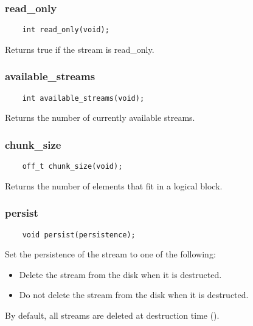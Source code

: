 \subsubsection{read\_only}
\begin{verbatim}
    int read_only(void);
\end{verbatim}
Returns true if the stream is read\_only.

    
\subsubsection{available\_streams}
\begin{verbatim}
    int available_streams(void);    
\end{verbatim}
Returns the number of currently available streams.

\subsubsection{chunk\_size}
\begin{verbatim}
    off_t chunk_size(void);
\end{verbatim}
Returns the number of elements that fit in a logical block.

\subsubsection{persist}
\begin{verbatim}
    void persist(persistence);
\end{verbatim}
Set the persistence of the stream to one of the following:
\begin{itemize}
\item {} Delete the stream from the disk when it is
  destructed.
\item {} Do not delete the stream from the disk when
  it is destructed.
\end{itemize}

By default, all streams are deleted at destruction time
().

